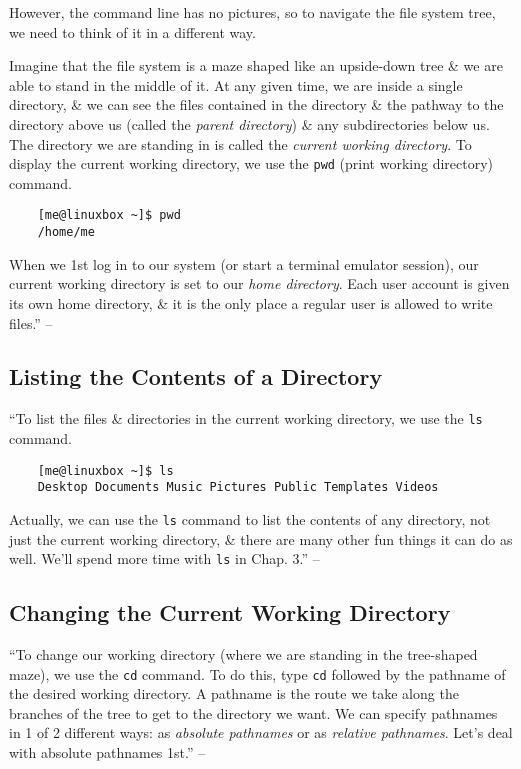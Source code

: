 \documentclass[oneside]{book}
\numberwithin{equation}{section}
\begin{document}
However, the command line has no pictures, so to navigate the file system tree, we need to think of it in a different way.

Imagine that the file system is a maze shaped like an upside-down tree \& we are able to stand in the middle of it. At any given time, we are inside a single directory, \& we can see the files contained in the directory \& the pathway to the directory above us (called the \textit{parent directory}) \& any subdirectories below us. The directory we are standing in is called the \textit{current working directory}. To display the current working directory, we use the \texttt{pwd} (print working directory) command.
\begin{verbatim}
	[me@linuxbox ~]$ pwd
	/home/me
\end{verbatim}
When we 1st log in to our system (or start a terminal emulator session), our current working directory is set to our \textit{home directory}. Each user account is given its own home directory, \& it is the only place a regular user is allowed to write files.'' -- \cite[pp. 44--45]{Shotts2019}

\subsection{Listing the Contents of a Directory}
``To list the files \& directories in the current working directory, we use the \texttt{ls} command.
\begin{verbatim}
	[me@linuxbox ~]$ ls
	Desktop Documents Music Pictures Public Templates Videos
\end{verbatim}
Actually, we can use the \texttt{ls} command to list the contents of any directory, not just the current working directory, \& there are many other fun things it can do as well. We'll spend more time with \texttt{ls} in Chap. 3.'' -- \cite[p. 45]{Shotts2019}

\subsection{Changing the Current Working Directory}
``To change our working directory (where we are standing in the tree-shaped maze), we use the \texttt{cd} command. To do this, type \texttt{cd} followed by the pathname of the desired working directory. A pathname is the route we take along the branches of the tree to get to the directory we want. We can specify pathnames in 1 of 2 different ways: as \textit{absolute pathnames} or as \textit{relative pathnames}. Let's deal with absolute pathnames 1st.'' -- \cite[p. 45]{Shotts2019}
\end{document}
